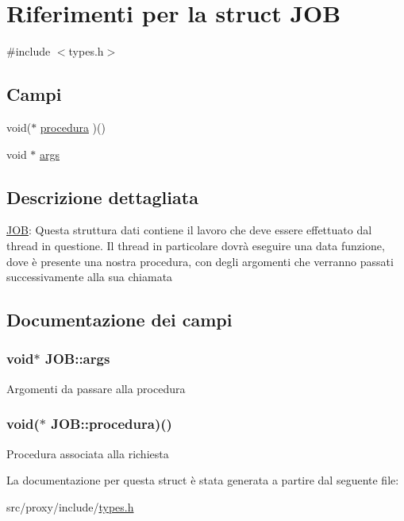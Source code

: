 \hypertarget{structJOB}{
\section{Riferimenti per la struct JOB}
\label{structJOB}
}


{\ttfamily \#include $<$types.h$>$}

\subsection*{Campi}
{\bf }\par
\begin{DoxyCompactItemize}
\item 
void($\ast$ \hyperlink{structJOB_af2a002df2c631342f8ac2e9f53847850}{procedura} )()
\item 
void $\ast$ \hyperlink{structJOB_a054753fc5e69ea142b6c071adfbe0e6e}{args}
\end{DoxyCompactItemize}



\subsection{Descrizione dettagliata}
\hyperlink{structJOB}{JOB}: Questa struttura dati contiene il lavoro che deve essere effettuato dal thread in questione. Il thread in particolare dovrà eseguire una data funzione, dove è presente una nostra procedura, con degli argomenti che verranno passati successivamente alla sua chiamata 

\subsection{Documentazione dei campi}
\hypertarget{structJOB_a054753fc5e69ea142b6c071adfbe0e6e}{
\subsubsection[{args}]{\setlength{\rightskip}{0pt plus 5cm}void$\ast$ {\bf JOB::args}}}
\label{structJOB_a054753fc5e69ea142b6c071adfbe0e6e}
Argomenti da passare alla procedura \hypertarget{structJOB_af2a002df2c631342f8ac2e9f53847850}{
\subsubsection[{procedura}]{\setlength{\rightskip}{0pt plus 5cm}void($\ast$ {\bf JOB::procedura})()}}
\label{structJOB_af2a002df2c631342f8ac2e9f53847850}
Procedura associata alla richiesta 

La documentazione per questa struct è stata generata a partire dal seguente file:\begin{DoxyCompactItemize}
\item 
src/proxy/include/\hyperlink{types_8h}{types.h}\end{DoxyCompactItemize}
